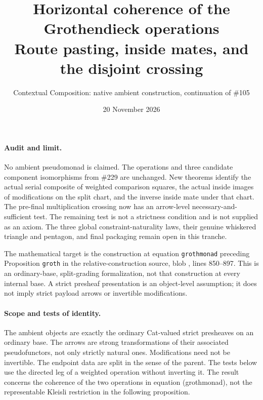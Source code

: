 \documentclass[10pt]{article}
\title{Horizontal coherence of the Grothendieck operations\\\large Route pasting, inside mates, and the disjoint crossing}
\author{Contextual Composition: native ambient construction, continuation of \#105}
\date{20 November 2026}
\begin{document}
\maketitle
\paragraph{Audit and limit.}
No ambient pseudomonad is claimed. The operations and three candidate component isomorphisms from \#229 are unchanged. New theorems identify the actual serial composite of weighted comparison squares, the actual inside images of modifications on the split chart, and the inverse inside mate under that chart. The pre-final multiplication crossing now has an arrow-level necessary-and-sufficient test. The remaining test is not a strictness condition and is not supplied as an axiom. The three global constraint-naturality laws, their genuine whiskered triangle and pentagon, and final packaging remain open in this tranche.
\par The mathematical target is the construction at equation \texttt{grothmonad} preceding Proposition \texttt{groth} in the relative-construction source, blob , lines 850--897. This is an ordinary-base, split-grading formalization, not that construction at every internal base. A strict presheaf presentation is an object-level assumption; it does not imply strict payload arrows or invertible modifications.

\paragraph{Scope and tests of identity.}
The ambient objects are exactly the ordinary Cat-valued strict presheaves on an ordinary base.
The arrows are strong transformations of their associated pseudofunctors, not only strictly natural ones. Modifications need not be invertible. The endpoint data are split in the sense of the parent. The tests below use the directed leg of a weighted operation without inverting it. The result concerns the coherence of the two operations in equation (grothmonad), not the representable Kleisli restriction in the following proposition.
\end{document}
